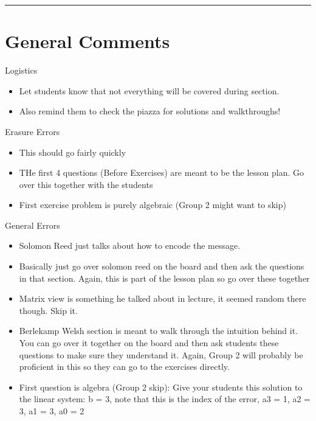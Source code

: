 \documentclass{exam}
\title{}
\date{Polynomials, Secret Sharing, Erasure Errors, General Errors, Self Reference}
\begin{document}
\maketitle
\rule{\textwidth}{0.15em}
\fontsize{12}{15}\selectfont
\thispagestyle{empty}


\section{General Comments}
\begin{questions}
\item Logistics
\begin{itemize}
\item Let students know that not everything will be covered during section. 
\item Also remind them to check the piazza for solutions and walkthroughs!
\end{itemize}
\item Erasure Errors
\begin{itemize}
\item This should go fairly quickly
\item THe first 4 questions (Before Exercises) are meant to be the lesson plan. Go over this together with the students
\item First exercise problem is purely algebraic (Group 2 might want to skip)
\end{itemize}

\item General Errors
\begin{itemize}
\item Solomon Reed just talks about how to encode the message.
\item Basically just go over solomon reed on the board and then ask the questions in that section. Again, this is part of the lesson plan so go over these together
\item Matrix view is something he talked about in lecture, it seemed random there though. Skip it.
\item Berlekamp Welsh section is meant to walk through the intuition behind it. You can go over it together on the board and then ask students these questions to make sure they understand it. Again, Group 2 will probably be proficient in this so they can go to the exercises directly.
\item First question is algebra (Group 2 skip): Give your students this solution to the linear system: b = 3, note that this is the index of the error, a3 = 1, a2 = 3, a1 = 3, a0 = 2
\end{itemize}


\end{questions}
\end{document}
